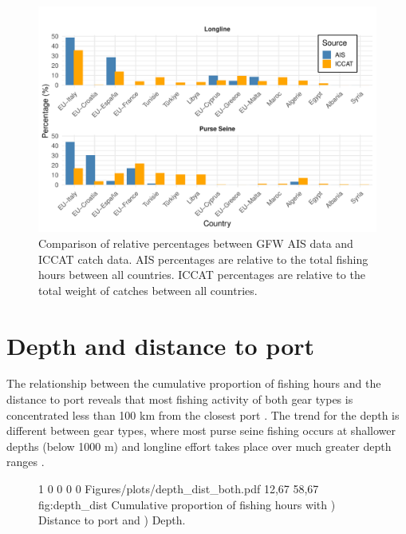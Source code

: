 \begin{figure}[h]
    \centering
    \includegraphics[width=1\linewidth, trim=0 0 0 1cm,clip]{Figures/plots/ais_vs_iccat.pdf}
    \caption{Comparison of relative percentages between GFW AIS data and ICCAT catch data. AIS percentages are relative to the
    total fishing hours between all countries. ICCAT percentages are relative to the total weight of catches between all countries.}
    \label{fig:ais_iccat}
\end{figure}

\FloatBarrier
\section{Depth and distance to port}

The relationship between the cumulative proportion of fishing hours and the distance to port reveals that most fishing activity of both gear types is concentrated
less than 100 km from the closest port . The trend for the depth is different between gear types, where most purse seine
fishing occurs at shallower depths (below 1000 m) and longline effort takes place over much greater depth ranges .

\begin{figure}[h]
    {1\linewidth}                           %
    {0 0 0 0}                       %
    {Figures/plots/depth_dist_both.pdf} %
    {12,67}                                  %
    {58,67}                                  %
    {fig:depth_dist}
    {%
    Cumulative proportion of fishing hours with ) Distance to port and ) Depth.}
\end{figure}
